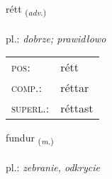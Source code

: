 \documentclass[frontgrid, backgrid]{flacards}\usepackage[]{graphicx}\usepackage[]{xcolor}
\begin{document}
\renewcommand{\flhead}{\vskip5pt \fboxsep=0pt {\small\bfseries\footnotesize Atviksorð | przysłówek}}
\renewcommand{\fcfoot}{\vskip5pt \fboxsep=0pt \hspace{2pt}{\small\bfseries\footnotesize 1K}}

\renewcommand{\blhead}{\vskip5pt {\small\bfseries\footnotesize Atviksorð | przysłówek }}
\renewcommand{\bcfoot}{\vskip5pt \hspace{2pt}{\small\bfseries\footnotesize 1K}}


{rétt \small{\textsubscript{(\textit{adv.})}} \\[1ex] %
\textphonetic{[rjɛht]} \\
pl.: \emph{dobrze; prawidłowo} \\  [2ex]
\renewcommand*{\arraystretch}{0.8}
\begin{tabular}{ll}
\textsc{pos}: & rétt \\ 
\textsc{comp.}: & réttar \\ 
\textsc{superl.}: & réttast \\
\end{tabular}
}

\renewcommand{\flhead}{\vskip5pt \fboxsep=0pt {\small\bfseries\footnotesize Nafnorð | rzeczownik}}
\renewcommand{\fcfoot}{\vskip5pt \fboxsep=0pt \hspace{2pt}{\small\bfseries\footnotesize 1K}}

\renewcommand{\blhead}{\vskip5pt {\small\bfseries\footnotesize Nafnorð | rzeczownik }}
\renewcommand{\bcfoot}{\vskip5pt \hspace{2pt}{\small\bfseries\footnotesize 1K}}


{fundur \small{\textsubscript{(\textit{m.})}} \\[1ex] %
\textphonetic{[fʏntʏr]} \\
pl.: \emph{zebranie, odkrycie} \\  [2ex]
\renewcommand*{\arraystretch}{0.8}
}
\end{document}
